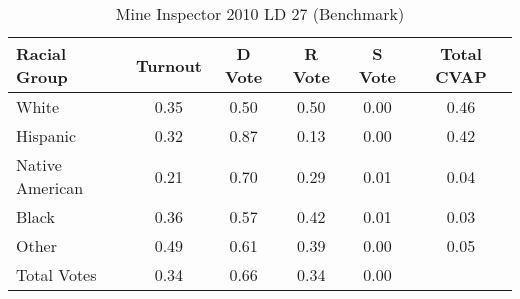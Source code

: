 \begin{table}[htb]
\begin{center}
\caption{Mine Inspector 2010 LD 27 (Benchmark)}
\label{smine_cvap_ld_27_benchmark}
\begin{tabular}{lccccc}
  \hline
Racial Group & Turnout & D Vote & R Vote & S Vote & Total CVAP \\ 
  \hline
White & 0.35 & 0.50 & 0.50 & 0.00 & 0.46 \\ 
  Hispanic & 0.32 & 0.87 & 0.13 & 0.00 & 0.42 \\ 
  Native American & 0.21 & 0.70 & 0.29 & 0.01 & 0.04 \\ 
  Black & 0.36 & 0.57 & 0.42 & 0.01 & 0.03 \\ 
  Other & 0.49 & 0.61 & 0.39 & 0.00 & 0.05 \\ 
  Total Votes & 0.34 & 0.66 & 0.34 & 0.00 &  \\ 
   \hline
\end{tabular}
\end{center}
\end{table}
